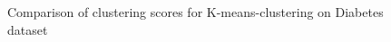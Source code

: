 \begin{figure}[H]
	\centering
	
	\caption{Comparison of clustering scores for K-means-clustering on Diabetes dataset}%
	\label{fig:kmeans_diabetes}
\end{figure}

